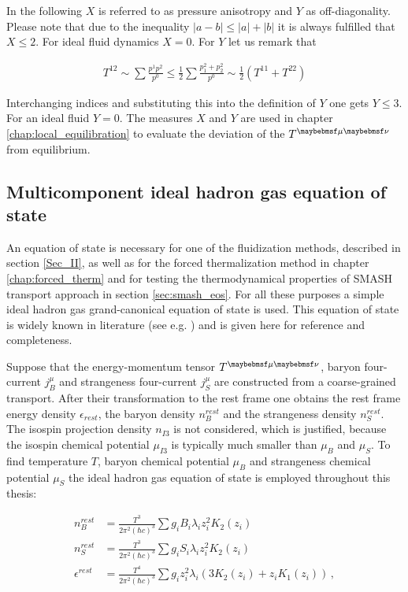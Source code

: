 In the following $X$ is referred to as pressure anisotropy and $Y$ as
off-diagonality. Please note that due to the inequality $|a-b| \le |a| + |b|$ it
is always fulfilled that $X \le 2$. For ideal fluid dynamics $X = 0$. For $Y$
let us remark that

\begin{align}
  T^{12} \sim \sum \frac{p^1 p^2}{p^0} \le \frac{1}{2} \sum \frac{p_1^2 + p_2^2}{p^0} \sim \frac{1}{2} (T^{11} + T^{22})
\end{align}

Interchanging indices and substituting this into the definition of $Y$ one gets
$Y \le 3$. For an ideal fluid $Y=0$. The measures $X$ and $Y$ are used in chapter
\ref{chap:local_equilibration} to evaluate the deviation of the $\Tmn$ from equilibrium.

\subsection{Multicomponent ideal hadron gas equation of state}

An equation of state is necessary for one of the fluidization methods,
described in section \ref{Sec_II}, as well as for the forced thermalization method in
chapter \ref{chap:forced_therm} and for testing the thermodynamical
properties of SMASH transport approach in section \ref{sec:smash_eos}.
For all these purposes a simple ideal hadron gas grand-canonical
equation of state is used. This equation of state is widely known in literature
(see e.g. \cite{Bravina:2008ra}) and is given here for reference and completeness.

Suppose that the energy-momentum tensor $\Tmn$, baryon four-current $j_B^{\mu}$
and strangeness four-current $j_S^{\mu}$ are constructed from a coarse-grained
transport.  After their transformation to the rest frame one obtains the rest frame
energy density $\epsilon_{rest}$, the baryon density $n_B^{rest}$ and the strangeness
density $n_S^{rest}$. The isospin projection density $n_{I3}$ is not considered, which
is justified, because the isospin chemical potential $\mu_{I3}$ is typically much
smaller than $\mu_B$ and $\mu_S$. To find temperature $T$, baryon chemical potential
$\mu_B$ and strangeness chemical potential $\mu_S$ the ideal hadron gas equation of
state is employed throughout this thesis:

\begin{align}
  \label{eq:id_hadgas_eos1}
  n_B^{rest} &= \frac{T^3}{2\pi^2 (\hbar c)^3} \sum g_i B_i \lambda_i z_i^2 K_2(z_i) \\
  \label{eq:id_hadgas_eos2}
  n_S^{rest} &= \frac{T^3}{2\pi^2 (\hbar c)^3} \sum g_i S_i \lambda_i z_i^2 K_2(z_i) \\
  \label{eq:id_hadgas_eos3}
  \epsilon^{rest} &= \frac{T^4}{2\pi^2 (\hbar c)^3} \sum g_i z_i^2 \lambda_i \left(3K_2(z_i) + z_i K_1(z_i) \right) \,,
\end{align}

